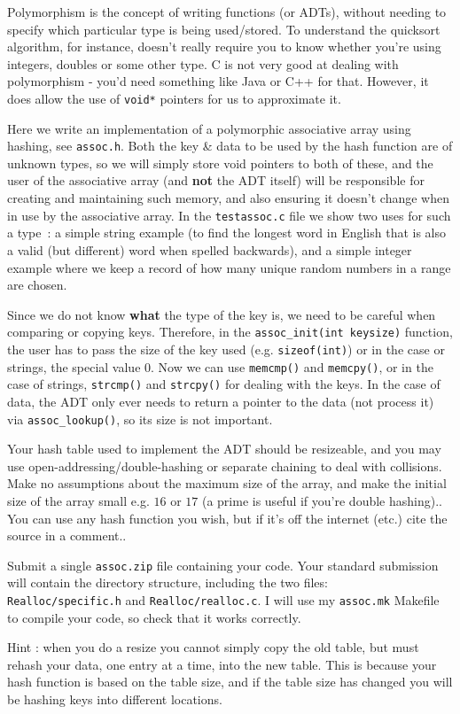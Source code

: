 
Polymorphism is the concept of writing functions (or ADTs), without
needing to specify which particular type is being used/stored. To
understand the quicksort algorithm, for instance, doesn't really require
you to know whether you're using integers, doubles or some other type. C
is not very good at dealing with polymorphism - you'd need something
like Java or C++ for that. However, it does allow the use of
\verb^void*^ pointers for us to approximate it.

\begin{exercise}
\label{ex:hahspoly}
Here we write an implementation of a polymorphic associative array using
hashing, see \verb^assoc.h^. Both the key \& data to be used by the hash
function are of
unknown types, so we will simply store void pointers to
both of these, and the user of the associative array (and {\bf not} the
ADT itself) will be responsible for creating and maintaining such memory,
and also ensuring it doesn't change when in use by the associative array.
In the \verb^testassoc.c^ file we show two uses for such a type~:
a simple string example (to find the longest word in English that is
also a valid (but different) word when spelled backwards), and a simple
integer example where we keep a record of how many unique random numbers
in a range are chosen.

Since we do not know {\bf what} the type of the key is, we
need to be careful when comparing or copying keys. Therefore, in the
\verb^assoc_init(int keysize)^ function, the user has to pass the size of the
key used (e.g. \verb^sizeof(int)^) or in the case or strings, the special value $0$.
Now we can use \verb^memcmp()^ and \verb^memcpy()^, or in the case of strings, \verb^strcmp()^
and \verb^strcpy()^ for dealing with the keys. In the case of data, the ADT only ever needs
to return a pointer to the data (not process it) via
\verb^assoc_lookup()^, so its size is not important.

Your hash table used to implement the ADT should be resizeable, and you may use
open-addressing/double-hashing or separate chaining to deal with collisions. Make no assumptions about
the maximum size of the array, and make the initial size of the array small e.g. $16$ or $17$
(a prime is useful if you're double hashing)..
You can use any hash function you wish, but if it's off the internet (etc.) cite
the source in a comment..

Submit a single \verb^assoc.zip^ file containing your code.
Your standard submission will contain the directory structure, including the two files:\\
\verb^Realloc/specific.h^ and \verb^Realloc/realloc.c^.
I will use my \verb^assoc.mk^ Makefile to compile your code,
so check that it works correctly.
\end{exercise}

Hint : when you do a resize you cannot simply
copy the old table, but must rehash your data, one entry at a time,
into the new table.  This is because your hash function is based on the
table size, and if the table size has changed you will be hashing keys
into different locations.
